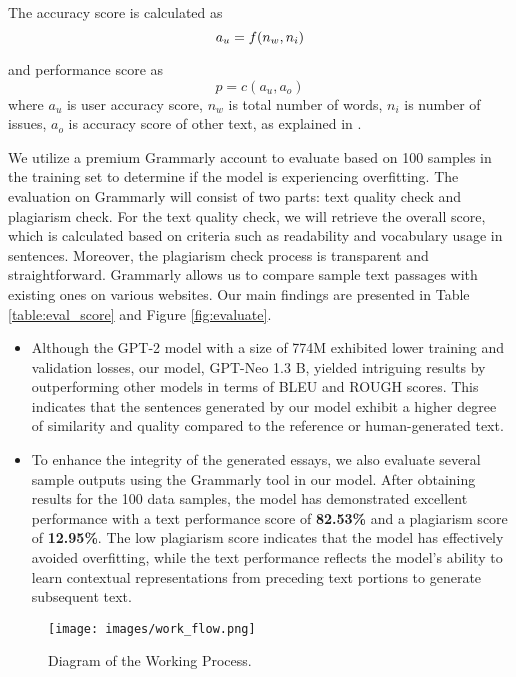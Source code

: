 \documentclass[conference]{IEEEtran}
\begin{document}
The accuracy score is calculated as
    \begin{equation}
        a_{u}=f(n_w,n_i)\\
    \end{equation}
    
and performance score as
    \begin{equation}
        p=c(a_{u},a_{o})
    \end{equation}  
    where $a_u$ is user accuracy score, $n_w$ is total number of words, $n_i$ is number of issues, $a_o$ is accuracy score of other text, as explained in \cite{grammarly}.

We utilize a premium Grammarly account to evaluate based on 100 samples in the training set to determine if the model is experiencing overfitting. The evaluation on Grammarly will consist of two parts: text quality check and plagiarism check. For the text quality check, we will retrieve the overall score, which is calculated based on criteria such as readability and vocabulary usage in sentences. Moreover, the plagiarism check process is transparent and straightforward. Grammarly allows us to compare sample text passages with existing ones on various websites.
Our main findings are presented in Table \ref{table:eval_score} and Figure \ref{fig:evaluate}.

\begin{itemize}
    \item Although the GPT-2 model with a size of 774M exhibited lower training and validation losses, our model, GPT-Neo 1.3 B, yielded intriguing results by outperforming other models in terms of BLEU and ROUGH scores. This indicates that the sentences generated by our model exhibit a higher degree of similarity and quality compared to the reference or human-generated text.
    \item To enhance the integrity of the generated essays, we also evaluate several sample outputs using the Grammarly tool in our model. After obtaining results for the 100 data samples, the model has demonstrated excellent performance with a text performance score of \textbf{82.53\%} and a plagiarism score of \textbf{12.95\%}. The low plagiarism score indicates that the model has effectively avoided overfitting, while the text performance reflects the model's ability to learn contextual representations from preceding text portions to generate subsequent text.
\end{itemize}
\begin{figure}[htbp]
            \centerline{\texttt{[image: images/work\_flow.png]}}
            \caption{Diagram of the Working Process.}
            \label{fig:work_flow}
        \end{figure}
\end{document}
